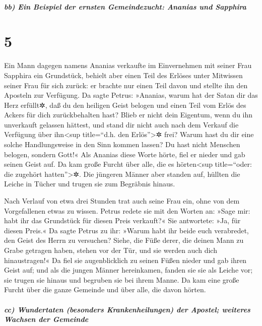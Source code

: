 \hypertarget{bb-ein-beispiel-der-ernsten-gemeindezucht-ananias-und-sapphira}{%
\subparagraph{bb) Ein Beispiel der ernsten Gemeindezucht: Ananias und
Sapphira}\label{bb-ein-beispiel-der-ernsten-gemeindezucht-ananias-und-sapphira}}

\hypertarget{section-4}{%
\section{5}\label{section-4}}

 Ein Mann dagegen namens Ananias verkaufte im Einvernehmen
mit seiner Frau Sapphira ein Grundstück,  behielt aber
einen Teil des Erlöses unter Mitwissen seiner Frau für sich zurück: er
brachte nur einen Teil davon und stellte ihn den Aposteln zur Verfügung.
 Da sagte Petrus: »Ananias, warum hat der Satan dir das
Herz erfüllt✲, daß du den heiligen Geist belogen und einen Teil vom
Erlös des Ackers für dich zurückbehalten hast?  Blieb er
nicht dein Eigentum, wenn du ihn unverkauft gelassen hättest, und stand
dir nicht auch nach dem Verkauf die Verfügung über ihn\textless sup
title=``d.h. den Erlös''\textgreater✲ frei? Warum hast du dir eine
solche Handlungsweise in den Sinn kommen lassen? Du hast nicht Menschen
belogen, sondern Gott!«  Als Ananias diese Worte hörte,
fiel er nieder und gab seinen Geist auf. Da kam große Furcht über alle,
die es hörten\textless sup title=``oder: die zugehört
hatten''\textgreater✲.  Die jüngeren Männer aber standen
auf, hüllten die Leiche in Tücher und trugen sie zum Begräbnis hinaus.

 Nach Verlauf von etwa drei Stunden trat auch seine Frau
ein, ohne von dem Vorgefallenen etwas zu wissen.  Petrus
redete sie mit den Worten an: »Sage mir: habt ihr das Grundstück für
diesen Preis verkauft?« Sie antwortete: »Ja, für diesen Preis.«
 Da sagte Petrus zu ihr: »Warum habt ihr beide euch
verabredet, den Geist des Herrn zu versuchen? Siehe, die Füße derer, die
deinen Mann zu Grabe getragen haben, stehen vor der Tür, und sie werden
auch dich hinaustragen!«  Da fiel sie augenblicklich zu
seinen Füßen nieder und gab ihren Geist auf; und als die jungen Männer
hereinkamen, fanden sie sie als Leiche vor; sie trugen sie hinaus und
begruben sie bei ihrem Manne.  Da kam eine große Furcht
über die ganze Gemeinde und über alle, die davon hörten.

\hypertarget{cc-wundertaten-besonders-krankenheilungen-der-apostel-weiteres-wachsen-der-gemeinde}{%
\subparagraph{cc) Wundertaten (besonders Krankenheilungen) der Apostel;
weiteres Wachsen der
Gemeinde}\label{cc-wundertaten-besonders-krankenheilungen-der-apostel-weiteres-wachsen-der-gemeinde}}

